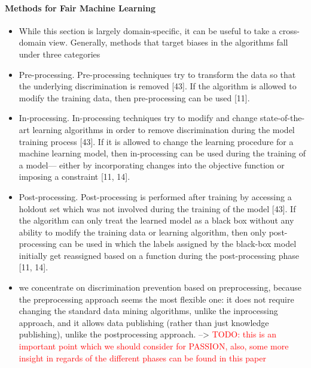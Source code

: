 \documentclass[12pt, a4paper, oneside]{book}   	%
\renewcommand{\todo}[1]{\textcolor{red}{TODO: #1}}
\begin{document}
			\paragraph{Methods for Fair Machine Learning}
			\begin{itemize}
				\item While this section is largely domain-specific, it can be useful to take a cross-domain view. Generally, methods that target biases in the algorithms fall under three categories \autocite{Mehrabi_2021}
				\item Pre-processing. Pre-processing techniques try to transform the data so that the underlying discrimination is removed [43]. If the algorithm is allowed to modify the training data, then pre-processing can be used [11].\autocite{Mehrabi_2021}
				\item In-processing. In-processing techniques try to modify and change state-of-the-art learning algorithms in order to remove discrimination during the model training process [43]. If it is allowed to change the learning procedure for a machine learning model, then in-processing can be used during the training of a model— either by incorporating changes into the objective function or imposing a constraint [11, 14].\autocite{Mehrabi_2021}
				\item Post-processing. Post-processing is performed after training by accessing a holdout set which was not involved during the training of the model [43]. If the algorithm can only treat the learned model as a black box without any ability to modify the training data or learning algorithm, then only post-processing can be used in which the labels assigned by the black-box model initially get reassigned based on a function during the post-processing phase [11, 14].\autocite{Mehrabi_2021}
				\item we concentrate on discrimination prevention based on preprocessing, because the preprocessing approach seems the most flexible one: it does not require changing the standard data mining algorithms, unlike the inprocessing approach, and it allows data publishing (rather than just knowledge publishing), unlike the postprocessing approach. \autocite{M62_} --> \todo{this is an important point which we should consider for PASSION, also, some more insight in regards of the different phases can be found in this paper}
				

\end{itemize}
\end{document}
